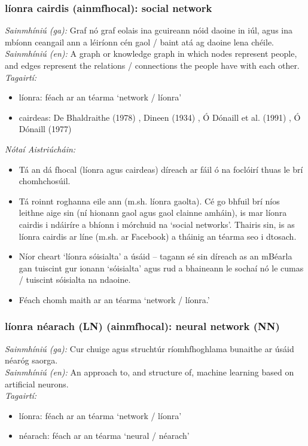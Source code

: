 \documentclass{article}
\begin{document}
\subsubsection*{líonra cairdis (ainmfhocal): social network}
 \noindent \textit{Sainmhíniú (ga):} Graf nó graf eolais ina gcuireann nóid daoine in iúl, agus ina mbíonn ceangail ann a léiríonn cén gaol / baint atá ag daoine lena chéile.
\\
 \noindent \textit{Sainmhíniú (en):} A graph or knowledge graph in which nodes represent people, and edges represent the relations / connections the people have with each other.
\\
 \noindent \textit{Tagairtí:}
\begin{itemize}
	\item líonra: féach ar an téarma `network / líonra'
	\item cairdeas: De Bhaldraithe (1978) \cite{de-bhaldraithe}, Dineen (1934) \cite{dineen}, Ó Dónaill et al. (1991) \cite{focloir-beag}, Ó Dónaill (1977) \cite{odonaill}
\end{itemize}

 \noindent \textit{Nótaí Aistriúcháin:}
\begin{itemize}
	\item Tá an dá fhocal (líonra agus cairdeas) díreach ar fáil ó na foclóirí thuas le brí chomhchosúil.
	\item Tá roinnt roghanna eile ann (m.sh. líonra gaolta). Cé go bhfuil brí níos leithne aige sin (ní hionann gaol agus gaol clainne amháin), is mar líonra cairdis i ndáiríre a bhíonn i mórchuid na `social networks'. Thairis sin, is as líonra cairdis ar líne (m.sh. ar Facebook) a tháinig an téarma seo i dtosach.
	\item Níor cheart `líonra sóisialta' a úsáid -- tagann sé sin díreach as an mBéarla gan tuiscint gur ionann `sóisialta' agus rud a bhaineann le sochaí nó le cumas / tuiscint sóisialta na ndaoine.
	\item Féach chomh maith ar an téarma `network / líonra.'
\end{itemize}


\subsubsection*{líonra néarach (LN) (ainmfhocal): neural network (NN)}
 \noindent \textit{Sainmhíniú (ga):} Cur chuige agus struchtúr ríomhfhoghlama bunaithe ar úsáid néaróg saorga.
\\
 \noindent \textit{Sainmhíniú (en):} An approach to, and structure of, machine learning based on artificial neurons.
\\
 \noindent \textit{Tagairtí:}
\begin{itemize}
	\item líonra: féach ar an téarma `network / líonra'
	\item néarach: féach ar an téarma `neural / néarach'
\end{itemize}
\end{document}
